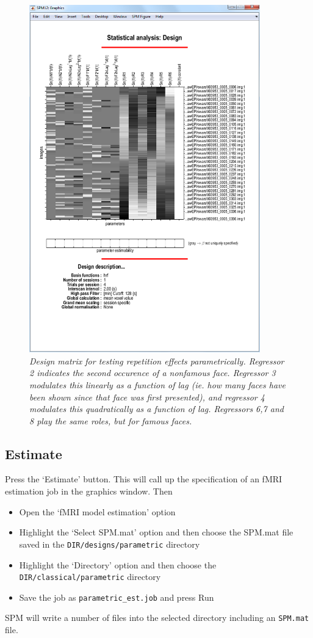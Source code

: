 \documentclass[a4paper,titlepage]{book}
\newcommand{\bi}{\begin{itemize}}
\newcommand{\ei}{\end{itemize}}
\begin{document}
\begin{figure}
\begin{center}
\includegraphics[width=100mm]{par_design}
\caption{\em Design matrix for testing repetition effects parametrically. Regressor 2 indicates the second occurence of a nonfamous face. Regressor 3 modulates this linearly as a function of lag (ie. how many faces have been shown since that face was first presented), and regressor 4 modulates this quadratically as a function of lag. Regressors 6,7 and 8 play the same roles, but for famous faces. \label{par_design} }
\end{center}
\end{figure}

\subsection{Estimate}

Press the `Estimate' button. This will call up the specification of an fMRI estimation job in the graphics window. Then
\bi
\item{Open the `fMRI model estimation' option}
\item{Highlight the `Select SPM.mat' option and then choose the SPM.mat
file saved in the \verb!DIR/designs/parametric! directory}
\item{Highlight the `Directory' option and then choose the 
\verb!DIR/classical/parametric! directory}
\item{Save the job as \verb!parametric_est.job! and press Run}
\ei
SPM will write a number of files into the selected directory including 
an \verb!SPM.mat! file.
\end{document}
